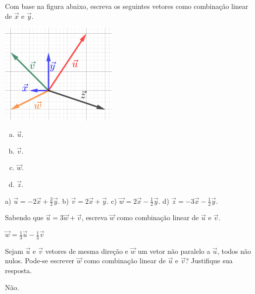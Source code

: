 \begin{exer}\label{exer:comblin_geo2}
  Com base na figura abaixo, escreva os seguintes vetores como combinação linear de $\vec{x}$ e $\vec{y}$.

  \begin{center}
    \includegraphics[width=2.25in]{cap_base/dados/fig_comblin_exer_geo2/fig.jpg}
  \end{center}

  \begin{enumerate}[a)]
    \item $\vec{u}$.
    \item $\vec{v}$.
    \item $\vec{w}$.
    \item $\vec{z}$.
  \end{enumerate}

\end{exer}
\begin{resp}
  a) $\vec{u} = -2\vec{x} + \frac{3}{2}\vec{y}$. b) $\vec{v} = 2\vec{x} + \vec{y}$. c) $\vec{w} = 2\vec{x} - \frac{1}{2}\vec{y}$. d) $\vec{z} = -3\vec{x} - \frac{1}{2}\vec{y}$.
\end{resp}


\begin{exer}
  Sabendo que $\vec{u}=3\vec{w}+\vec{v}$, escreva $\vec{w}$ como combinação linear de $\vec{u}$ e $\vec{v}$.
\end{exer}
\begin{resp}
  $\vec{w} = \frac{1}{3}\vec{u} - \frac{1}{3}\vec{v}$
\end{resp}

\begin{exer}
  Sejam $\vec{u}$ e $\vec{v}$ vetores de mesma direção e $\vec{w}$ um vetor não paralelo a $\vec{u}$, todos não nulos. Pode-se escrever $\vec{w}$ como combinação linear de $\vec{u}$ e $\vec{v}$? Justifique sua resposta.
\end{exer}
\begin{resp}
  Não.
\end{resp}

